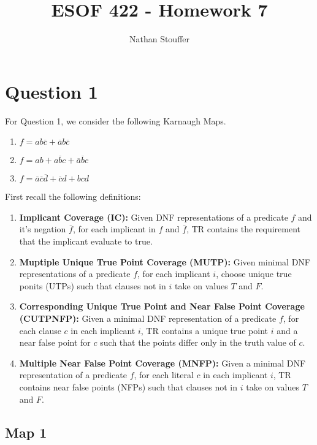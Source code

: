 \documentclass{article}
\newcommand{\nota}{\overline{a}}
\newcommand{\notb}{\overline{b}}
\newcommand{\notc}{\overline{c}}
\newcommand{\notd}{\overline{d}}
\newcommand{\fbar}{\overline{f}}
\begin{document}
\title{ESOF 422 - Homework 7}
\author{Nathan Stouffer}

\maketitle
\newpage
\section*{Question 1}

For Question 1, we consider the following Karnaugh Maps.
\begin{enumerate}
	\item $ f = ab \notc + \nota b \notc$
	\item $ f = ab + a \notb c + \nota \notb c $
	\item $ f = \nota \notc \notd + \notc d + bcd $
\end{enumerate}
First recall the following definitions:
\begin{enumerate}
	\item \textbf{Implicant Coverage (IC):} Given DNF representations of a predicate $f$ and it's negation $\overline{f}$, for each implicant in $f$ and $\fbar$, TR contains the requirement that the implicant evaluate to true.
	\item \textbf{Muptiple Unique True Point Coverage (MUTP):} Given minimal DNF representations of a predicate $f$, for each implicant $i$, choose unique true ponits (UTPs) such that clauses not in $i$ take on values $T$ and $F$.
	\item \textbf{Corresponding Unique True Point and Near False Point Coverage (CUTPNFP):} Given a minimal DNF representation of a predicate $f$, for each clause $c$ in each implicant $i$, TR contains a unique true point $i$ and a near false point for $c$ such that the points differ only in the truth value of $c$.
	\item \textbf{Multiple Near False Point Coverage (MNFP):} Given a minimal DNF representation of a predicate $f$, for each literal $c$ in each implicant $i$, TR contains near false points (NFPs) such that clauses not in $i$ take on values $T$ and $F$.
\end{enumerate}

\subsection*{Map 1}
\end{document}
